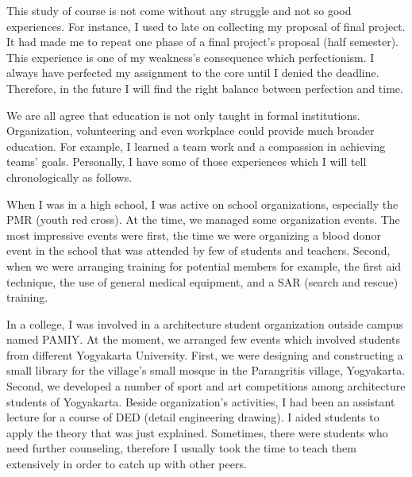 \documentclass[11pt]{simart} %
\begin{document}
This study of course is not come without any struggle and not so good experiences. For instance, I used to late on collecting my proposal of final project. It had made me to repeat one phase of a final project's proposal (half semester). This experience is one of my weakness's consequence which perfectionism. I always have perfected my assignment to the core until I denied the deadline. Therefore, in the future I will find the right balance between perfection and time.

We are all agree that education is not only taught in formal institutions. Organization, volunteering and even workplace could provide much broader education. For example, I learned a team work and a compassion in achieving teams' goals. Personally, I have some of those experiences which I will tell chronologically as follows.

When I was in a high school, I was active on school organizations, especially the PMR (youth red cross). At the time, we managed some organization events. The most impressive events were first, the time we were organizing a blood donor event in the school that was attended by few of students and teachers. Second, when we were arranging training for potential members for example, the first aid technique, the use of general medical equipment, and a SAR (search and rescue) training.

In a college, I was involved in a architecture student organization outside campus named PAMIY. At the moment, we arranged few events which involved students from different Yogyakarta University. First, we were designing and constructing a small library for the village's small mosque in the Parangritis village, Yogyakarta. Second, we developed a number of sport and art competitions among architecture students of Yogyakarta. Beside organization's activities, I had been an assistant lecture for a course of DED (detail engineering drawing). I aided students to apply the theory that was just explained. Sometimes, there were  students who need further counseling, therefore I usually took the time to teach them extensively in order to catch up with other peers.
\end{document}
